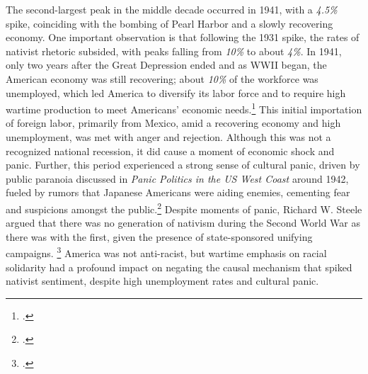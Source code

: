 \documentclass[12pt,a4paper]{article}
\begin{document}
The second-largest peak in the middle decade occurred in 1941, with a \textit{4.5\%} spike, coinciding with the bombing of Pearl Harbor and a slowly recovering economy. One important observation is that following the 1931 spike, the rates of nativist rhetoric subsided, with peaks falling from \textit{10\%} to about \textit{4\%}. In 1941, only two years after the Great Depression ended and as WWII began, the American economy was still recovering; about \textit{10\%} of the workforce was unemployed, which led America to diversify its labor force and to require high wartime production to meet Americans' economic needs.\footcite{daniels_immigration_2006} This initial importation of foreign labor, primarily from Mexico, amid a recovering economy and high unemployment, was met with anger and rejection. Although this was not a recognized national recession, it did cause a moment of economic shock and panic. Further, this period experienced a strong sense of cultural panic, driven by public paranoia discussed in \textit{Panic Politics in the US West Coast} around 1942, fueled by rumors that Japanese Americans were aiding enemies, cementing fear and suspicions amongst the public.\footcite{berman_panic_nodate} Despite moments of panic, Richard W. Steele argued that there was no generation of nativism during the Second World War as there was with the first, given the presence of state-sponsored unifying campaigns. \footcite{steele_war_1989} America was not anti-racist, but wartime emphasis on racial solidarity had a profound impact on negating the causal mechanism that spiked nativist sentiment, despite high unemployment rates and cultural panic.
\end{document}
